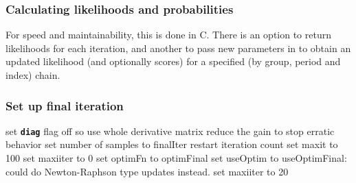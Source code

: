\documentclass[12pt, a4paper]{article}
\renewcommand{\=}{\,=\,}
\newcommand{\+}{\,+\,}
\newcommand{\sfn}[1]{\textbf{\texttt{#1}}}
\begin{document}
\subsubsection{Calculating likelihoods and probabilities}
For speed and maintainability, this is done in C. There is an option to return
likelihoods for each iteration, and another to pass new parameters in to obtain
an updated likelihood (and optionally scores) for a specified (by group, period
and index) chain.
\subsubsection{Set up final iteration}
\label{sec:final}
\begin{algorithmic}
\STATE set \sfn{diag} flag off so use whole derivative matrix
\STATE reduce the gain to stop erratic behavior
\STATE set number of samples to finalIter
\STATE restart iteration count
\STATE set maxit to 100
\STATE set maxiiter to 0
\STATE set optimFn to optimFinal
\STATE set useOptim to useOptimFinal: could do Newton-Raphson type updates
instead.
\ELSE
\STATE set maxiiter to 20
\ENDIF
\end{algorithmic}
\end{document}
